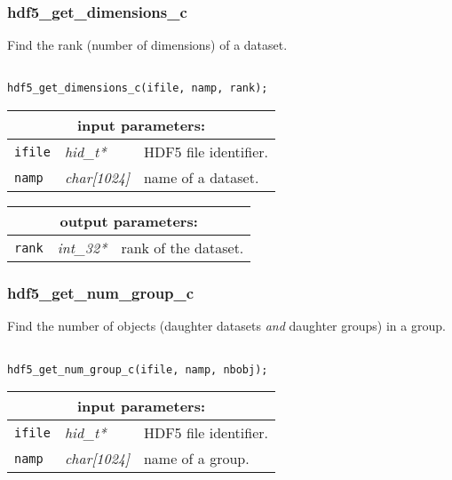 \subsubsection{hdf5\_get\_dimensions\_c}

Find the rank (number of dimensions) of a dataset.

\begin{verbatim}

hdf5_get_dimensions_c(ifile, namp, rank);
\end{verbatim}

\noindent
\begin{tabular}{|p{1.5cm}|p{2cm}|p{11cm}|}
\hline
\multicolumn{3}{|c|}{\bf input parameters:} \\
\hline
{\tt ifile} & {\it hid\_t*} & HDF5 file identifier. \\
\hline
{\tt namp} & {\it char[1024]} & name of a dataset. \\
\hline
\end{tabular}

\vskip 0.8cm

\noindent
\begin{tabular}{|p{1.5cm}|p{2cm}|p{11cm}|}
\hline
\multicolumn{3}{|c|}{\bf output parameters:} \\
\hline
{\tt rank} & {\it int\_32*} & rank of the dataset. \\
\hline
\end{tabular}

\subsubsection{hdf5\_get\_num\_group\_c}

Find the number of objects (daughter datasets {\sl and} daughter groups) in a group.

\begin{verbatim}

hdf5_get_num_group_c(ifile, namp, nbobj);
\end{verbatim}

\noindent
\begin{tabular}{|p{1.5cm}|p{2cm}|p{11cm}|}
\hline
\multicolumn{3}{|c|}{\bf input parameters:} \\
\hline
{\tt ifile} & {\it hid\_t*} & HDF5 file identifier. \\
\hline
{\tt namp} & {\it char[1024]} & name of a group. \\
\hline
\end{tabular}

